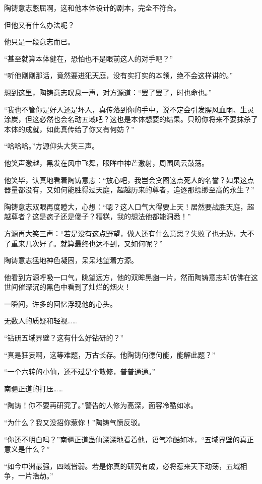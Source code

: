 \begin{this_body}
陶铸意志憋屈啊，这和他本体设计的剧本，完全不符合。

但他又有什么办法呢？

他只是一段意志而已。

“甚至就算本体健在，恐怕也不是眼前这人的对手吧？”

“听他刚刚那话，竟然要进犯天庭，没有实打实的本领，绝不会这样讲的。”

想到这里，陶铸意志叹息一声，对方源道：“罢了罢了，时也命也。”

“我也不管你是好人还是坏人，真传落到你的手中，说不定会引发腥风血雨、生灵涂炭，但这必然也会名动五域吧？这也是本体想要的结果。只盼你将来不要抹杀了本体的成就，如此真传给了你又有何妨？”

“哈哈哈。”方源仰头大笑三声。

他笑声激越，黑发在风中飞舞，眼眸中神芒激射，周围风云鼓荡。

他笑毕，认真地看着陶铸意志：“放心吧，我岂会贪图这点死人的名誉？如果这点器量都没有，又如何能胜得过天庭，超越历来的尊者，追逐那缥缈至高的永生？”

陶铸意志双眼再度瞪大，心想：“嗯？这人口气大得要上天！居然要战胜天庭，超越尊者？这是疯子还是傻子？糟糕，我的想法他都能洞悉！”

方源再大笑三声：“若是没有这点野望，做人还有什么意思？失败了也无妨，大不了重来几次好了。就算最终也达不到，又如何呢？”

陶铸意志猛地神色凝固，呆呆地望着方源。

他看到方源呼吸一口气，眺望远方，他的双眸黑幽一片，然而陶铸意志却仿佛在这世间催深沉的黑色中看到了灿烂的烟火！

一瞬间，许多的回忆浮现他的心头。

无数人的质疑和轻视……

“钻研五域界壁？这有什么好钻研的？”

“真是狂妄啊，这等难题，万古长存。他陶铸何德何能，能解此题？”

“一个六转的小仙，还不过是个散修，普普通通。”

南疆正道的打压……

“陶铸！你不要再研究了。”警告的人修为高深，面容冷酷如冰。

“为什么？我又没招你惹你！”陶铸气愤反驳。

“你还不明白吗？”南疆正道蛊仙深深地看着他，语气冷酷如冰，“五域界壁的真正意义是什么？”

“如今中洲最强，四域皆弱。若是你真的研究有成，必将惹来天下动荡，五域相争，一片浩劫。”


\end{this_body}

